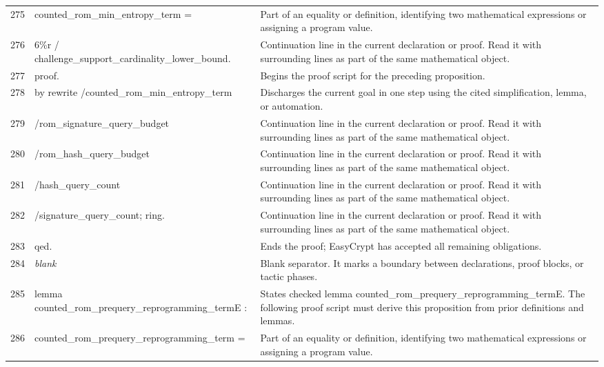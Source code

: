 \documentclass[10pt]{article}
\begin{document}
\begin{longtable}{r L{0.53\textwidth} L{0.37\textwidth}}
275 & {\ttfamily\scriptsize   counted\_rom\_min\_entropy\_term =} & Part of an equality or definition, identifying two mathematical expressions or assigning a program value. \\
276 & {\ttfamily\scriptsize     6\%r / challenge\_support\_cardinality\_lower\_bound.} & Continuation line in the current declaration or proof.  Read it with surrounding lines as part of the same mathematical object. \\
277 & {\ttfamily\scriptsize proof.} & Begins the proof script for the preceding proposition. \\
278 & {\ttfamily\scriptsize by rewrite /counted\_rom\_min\_entropy\_term} & Discharges the current goal in one step using the cited simplification, lemma, or automation. \\
279 & {\ttfamily\scriptsize            /rom\_signature\_query\_budget} & Continuation line in the current declaration or proof.  Read it with surrounding lines as part of the same mathematical object. \\
280 & {\ttfamily\scriptsize            /rom\_hash\_query\_budget} & Continuation line in the current declaration or proof.  Read it with surrounding lines as part of the same mathematical object. \\
281 & {\ttfamily\scriptsize            /hash\_query\_count} & Continuation line in the current declaration or proof.  Read it with surrounding lines as part of the same mathematical object. \\
282 & {\ttfamily\scriptsize            /signature\_query\_count; ring.} & Continuation line in the current declaration or proof.  Read it with surrounding lines as part of the same mathematical object. \\
283 & {\ttfamily\scriptsize qed.} & Ends the proof; EasyCrypt has accepted all remaining obligations. \\
284 & {\ttfamily\scriptsize \emph{blank}} & Blank separator.  It marks a boundary between declarations, proof blocks, or tactic phases. \\
285 & {\ttfamily\scriptsize lemma counted\_rom\_prequery\_reprogramming\_termE :} & States checked lemma counted\_rom\_prequery\_reprogramming\_termE.  The following proof script must derive this proposition from prior definitions and lemmas. \\
286 & {\ttfamily\scriptsize   counted\_rom\_prequery\_reprogramming\_term =} & Part of an equality or definition, identifying two mathematical expressions or assigning a program value. \\

\end{longtable}
\end{document}
